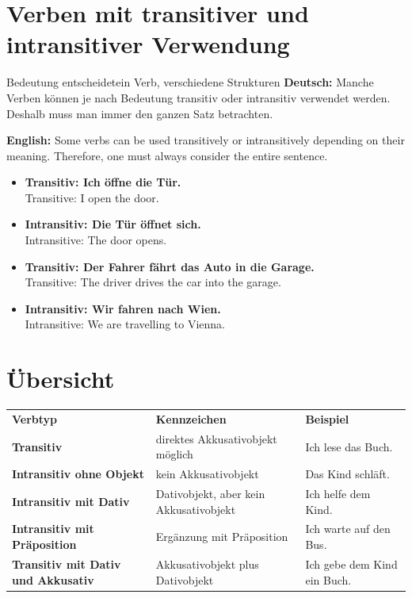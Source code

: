\documentclass[a4paper,11pt]{article}
\newcommand{\GermanText}[1]{\textbf{Deutsch: }#1\par}
\newcommand{\EnglishText}[1]{{\small\color{SoftGray}\textbf{English: }#1\par}}
\newcommand{\ExampleItem}[2]{\item \textbf{#1}\\{\small\color{SoftGray}#2}}
\begin{document}
    
    \section{Verben mit transitiver und intransitiver Verwendung}
        
        \begin{grammarentry}{Bedeutung entscheidet}{ein Verb, verschiedene Strukturen}
            \GermanText{Manche Verben können je nach Bedeutung transitiv oder intransitiv verwendet werden. Deshalb muss man immer den ganzen Satz betrachten.}
            \EnglishText{Some verbs can be used transitively or intransitively depending on their meaning. Therefore, one must always consider the entire sentence.}
        \end{grammarentry}
        
        \begin{exbox}
            \begin{itemize}
                \ExampleItem{Transitiv: Ich öffne die Tür.}{Transitive: I open the door.}
                \ExampleItem{Intransitiv: Die Tür öffnet sich.}{Intransitive: The door opens.}
                \ExampleItem{Transitiv: Der Fahrer fährt das Auto in die Garage.}{Transitive: The driver drives the car into the garage.}
                \ExampleItem{Intransitiv: Wir fahren nach Wien.}{Intransitive: We are travelling to Vienna.}
            \end{itemize}
        \end{exbox}
    
    
    \section{Übersicht}
        
        \begin{longtable}{>{\bfseries}p{3cm}|p{4.3cm}|p{4.5cm}}
            \rowcolor{HeaderBlueDark}
            \color{white}\textbf{Verbtyp} &
            \color{white}\textbf{Kennzeichen} &
            \color{white}\textbf{Beispiel} \\
            Transitiv & direktes Akkusativobjekt möglich & Ich lese das Buch. \\
            Intransitiv ohne Objekt & kein Akkusativobjekt & Das Kind schläft. \\
            Intransitiv mit Dativ & Dativobjekt, aber kein Akkusativobjekt & Ich helfe dem Kind. \\
            Intransitiv mit Präposition & Ergänzung mit Präposition & Ich warte auf den Bus. \\
            Transitiv mit Dativ und Akkusativ & Akkusativobjekt plus Dativobjekt & Ich gebe dem Kind ein Buch. \\
        \end{longtable}
    
\end{document}
